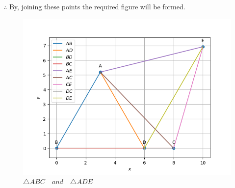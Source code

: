 \documentclass[11pt, a4paper]{article}
\begin{document}
\begin{enumerate}
\begin{enumerate}[label=(\roman*)]
$\therefore$ By, joining these points the required figure will be formed.

\end{enumerate}
\begin{figure}[H]
    \includegraphics[width=\columnwidth]{figs/Final_python.png}
	\caption{$\triangle ABC \hspace{12pt} and \hspace{12pt} \triangle ADE$}
    \label{fig:fig2}
\end{figure}
\end{enumerate}
\end{document}
